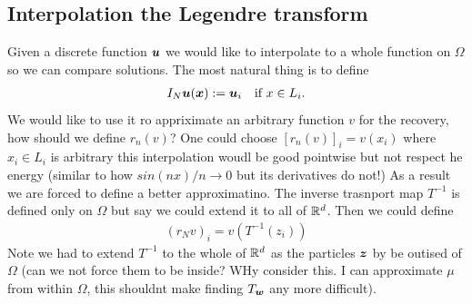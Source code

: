 \documentclass[
    a4paper,
    DIV=13,
    abstract=true,
    numbers=noenddot
]{scrartcl}
\begin{document}
\subsection{Interpolation the Legendre transform}
Given a discrete function ${\bm{u}}$ we would like to interpolate to a whole function on $\Omega$ so we can compare solutions. The most natural thing is to define 
\begin{align*}
    I_N {\bm{u}}({\bm{x}}):={\bm{u}}_i \quad \text{if } x \in L_i.
\end{align*}
We would like to use it ro appriximate an arbitrary function $v$ for the recovery, how should we define $r_n(v)$? One could choose $[r_n(v)]_i=v(x_i)$ where $x_i \in L_i$ is arbitrary this interpolation woudl be good pointwise but not respect he energy (similar to how $sin (nx)/n \to 0$ but its derivatives do not!)
As a result we are forced to define a better approximatino. The inverse trasnport map $T ^{-1}$ is defined only on $\Omega$ but say we could extend it to all of $\mathbb{R}^d$. Then we could define
\begin{align*}
  (r_Nv)_i= v(T^{-1}(z_i)) 
\end{align*}
Note we had to extend $T ^{-1}$ to the whole of $\mathbb{R}^d$ as the particles ${\bm{z}}$ by be outised of $\Omega$ (can we not force them to be inside? WHy consider this. I can approximate $\mu$ from within $\Omega$, this shouldnt make finding $T_ {\bm{w}}$ any more difficult).
\end{document}
